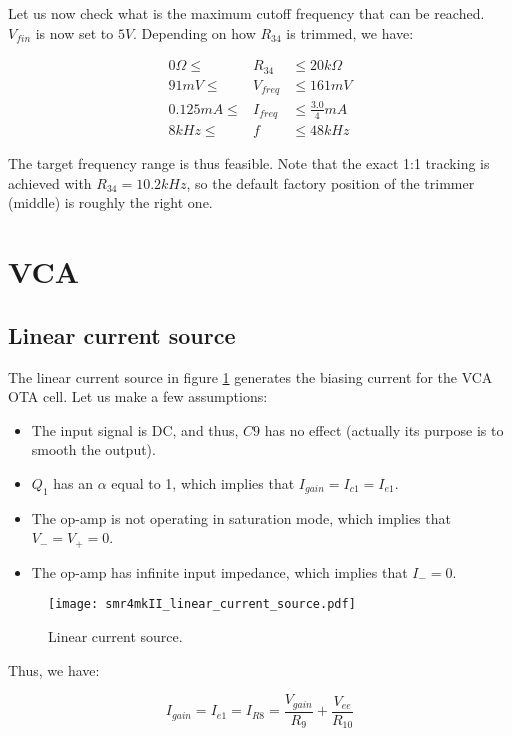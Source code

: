 \documentclass[a4paper,11pt]{article}
\begin{document}
Let us now check what is the maximum cutoff frequency that can be reached. $V_{fin}$ is now set to $5V$. Depending on how $R_{34}$ is trimmed, we have:

\begin{eqnarray}
0 \Omega \leq &R_{34}& \leq 20 k\Omega \\
91mV \leq &V_{freq}& \leq 161mV \\
0.125 mA \leq &I_{freq}& \leq \frac{3.0}{4} mA \\
8kHz \leq &f& \leq 48kHz
\end{eqnarray}

The target frequency range is thus feasible. Note that the exact 1:1 tracking is achieved with $R_{34} = 10.2 kHz$, so the default factory position of the trimmer (middle) is roughly the right one.

\section{VCA}
\label{sec:vca}

\subsection{Linear current source}

The linear current source in figure \ref{fig:linear} generates the biasing current for the VCA OTA cell. Let us make a few assumptions:
\begin{itemize}
\item The input signal is DC, and thus, $C9$ has no effect (actually its purpose is to smooth the output).
\item $Q_1$ has an $\alpha$ equal to 1, which implies that $I_{gain} = I_{c1} = I_{e1}$.
\item The op-amp is not operating in saturation mode, which implies that $V_- = V_+ = 0$.
\item The op-amp has infinite input impedance, which implies that $I_- = 0$.
\end{itemize}

\begin{figure}
\centering
\texttt{[image: smr4mkII\_linear\_current\_source.pdf]}
\caption{Linear current source.}
\label{fig:linear}
\end{figure}

Thus, we have:

\begin{equation}
I_{gain} = I_{e1} = I_{R8} = \frac{V_{gain}}{R_9} + \frac{V_{ee}}{R_{10}}
\end{equation}
\end{document}
